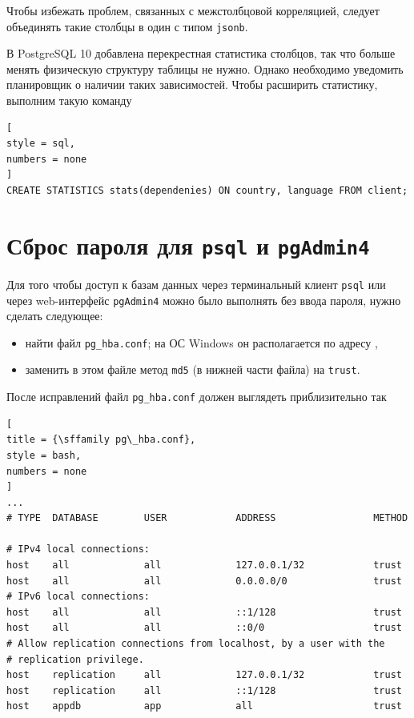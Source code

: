 \documentclass[%
	11pt,
	a4paper,
	utf8,
		]{article}
\begin{document}
Чтобы избежать проблем, связанных с межстолбцовой корреляцией, следует объединять такие столбцы в один с типом \texttt{jsonb}.

В PostgreSQL 10 добавлена перекрестная статистика столбцов, так что больше менять физическую структуру таблицы не нужно. Однако необходимо уведомить планировщик о наличии таких зависимостей. Чтобы расширить статистику, выполним такую команду
\begin{lstlisting}[
style = sql,
numbers = none
]
CREATE STATISTICS stats(dependenies) ON country, language FROM client;
\end{lstlisting}


\section{Сброс пароля для \texttt{psql} и \texttt{pgAdmin4}}

Для того чтобы доступ к базам данных через терминальный клиент \texttt{psql} или через web-интерфейс \texttt{pgAdmin4} можно было выполнять без ввода пароля, нужно сделать следующее:
\begin{itemize}
	\item найти файл \texttt{pg\_hba.conf}; на ОС Windows он располагается по адресу ,
	
	\item заменить в этом файле метод \texttt{md5} (в нижней части файла) на \texttt{trust}.
\end{itemize}

После исправлений файл \texttt{pg\_hba.conf} должен выглядеть приблизительно так
\begin{lstlisting}[
title = {\sffamily pg\_hba.conf},
style = bash,
numbers = none
]
...
# TYPE  DATABASE        USER            ADDRESS                 METHOD

# IPv4 local connections:
host    all             all             127.0.0.1/32            trust
host    all             all             0.0.0.0/0               trust
# IPv6 local connections:
host    all             all             ::1/128                 trust
host    all             all             ::0/0                   trust
# Allow replication connections from localhost, by a user with the
# replication privilege.
host    replication     all             127.0.0.1/32            trust
host    replication     all             ::1/128                 trust
host    appdb           app             all                     trust

\end{lstlisting}
\end{document}
